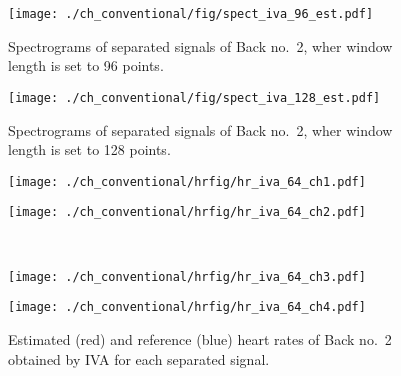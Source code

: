 \begin{figure}[tb]
\centering
\texttt{[image: ./ch\_conventional/fig/spect\_iva\_96\_est.pdf]}
\caption{Spectrograms of separated signals of Back no.~2, wher window length is set to 96 points.}
\label{fig:siva96est}
\end{figure}

\begin{figure}[tb]
\centering
\texttt{[image: ./ch\_conventional/fig/spect\_iva\_128\_est.pdf]}
\caption{Spectrograms of separated signals of Back no.~2, wher window length is set to 128 points.}
\label{fig:siva128est}
\end{figure}

\begin{figure}[htbp]
     \begin{minipage}[t]{0.45\hsize}
        \centering
        \texttt{[image: ./ch\_conventional/hrfig/hr\_iva\_64\_ch1.pdf]}
        \label{fig:hriva32ch1}
      \end{minipage} 
      \begin{minipage}[t]{0.45\hsize}
        \centering
        \texttt{[image: ./ch\_conventional/hrfig/hr\_iva\_64\_ch2.pdf]}
        \label{fig:hriva32ch2}
      \end{minipage} \\
      \begin{minipage}[t]{0.45\hsize}
        \centering
        \texttt{[image: ./ch\_conventional/hrfig/hr\_iva\_64\_ch3.pdf]}
        \label{fig:hriva32ch3}
      \end{minipage} 
      \begin{minipage}[t]{0.45\hsize}
        \centering
        \texttt{[image: ./ch\_conventional/hrfig/hr\_iva\_64\_ch4.pdf]}
        \label{fig:hriva32ch4}
      \end{minipage} 
     \caption{Estimated (red) and reference (blue) heart rates of Back no.~2 obtained by IVA for each separated signal.}
     \label{fig:hriva}
  \end{figure}

